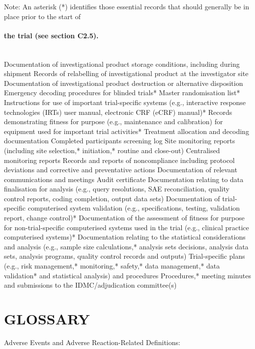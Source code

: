 \documentclass[11pt]{article}
\begin{document}
Note: An asterisk (*) identifies those essential records that should generally be in place prior to the start of


\paragraph{the trial (see section C2.5).}\mbox{}\\

Documentation of investigational product storage conditions, including during shipment Records of relabelling of investigational product at the investigator site Documentation of investigational product destruction or alternative disposition Emergency decoding procedures for blinded trials* Master randomisation list* Instructions for use of important trial-specific systems (e.g., interactive response technologies (IRTs) user manual, electronic CRF (eCRF) manual)* Records demonstrating fitness for purpose (e.g., maintenance and calibration) for equipment used for important trial activities* Treatment allocation and decoding documentation Completed participants screening log Site monitoring reports (including site selection,* initiation,* routine and close-out) Centralised monitoring reports Records and reports of noncompliance including protocol deviations and corrective and preventative actions Documentation of relevant communications and meetings Audit certificate Documentation relating to data finalisation for analysis (e.g., query resolutions, SAE reconciliation, quality control reports, coding completion, output data sets) Documentation of trial-specific computerised system validation (e.g., specifications, testing, validation report, change control)* Documentation of the assessment of fitness for purpose for non-trial-specific computerised systems used in the trial (e.g., clinical practice computerised systems)* Documentation relating to the statistical considerations and analysis (e.g., sample size calculations,* analysis sets decisions, analysis data sets, analysis programs, quality control records and outputs) Trial-specific plans (e.g., risk management,* monitoring,* safety,* data management,* data validation* and statistical analysis) and procedures Procedures,* meeting minutes and submissions to the IDMC/adjudication committee(s)


\section{GLOSSARY}

Adverse Events and Adverse Reaction-Related Definitions:
\end{document}
